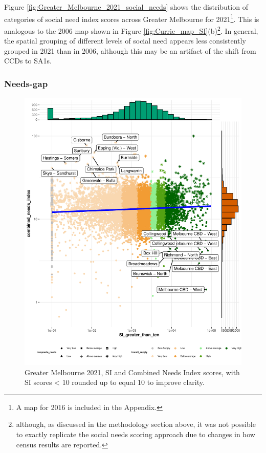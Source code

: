 \documentclass[preprint, 3p,
authoryear]{elsarticle} %
\begin{document}
Figure \ref{fig:Greater_Melbourne_2021_social_needs} shows the
distribution of categories of social need index scores across Greater
Melbourne for 2021\footnote{A map for 2016 is included in the Appendix.}.
This is analogous to the 2006 map shown in Figure
\ref{fig:Currie_map_SI}(b)\footnote{although, as discussed in the
  methodology section above, it was not possible to exactly replicate
  the \citet{currie2010identifying} social needs scoring approach due to
  changes in how census results are reported.}. In general, the spatial
grouping of different levels of social need appears less consistently
grouped in 2021 than in 2006, although this may be an artifact of the
shift from CCDs to SA1s.

\subsubsection{Needs-gap}\label{needs-gap}

\begin{figure}
\centering
\includegraphics{ReynoldsCurrieQu2024_files/figure-latex/Greater_Melbourne_2021_needs_gap_scatterplot_figure-1.pdf}
\caption{Greater Melbourne 2021, SI and Combined Needs Index scores,
with SI scores \textless{} 10 rounded up to equal 10 to improve
clarity.}
\end{figure}
\end{document}
